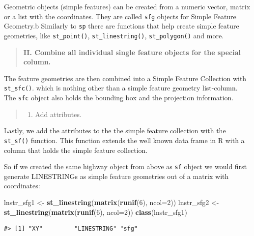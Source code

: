 \documentclass[]{book}
\newenvironment{Shaded}{\begin{snugshade}}{\end{snugshade}}
\newcommand{\KeywordTok}[1]{\textcolor[rgb]{0.13,0.29,0.53}{\textbf{#1}}}
\newcommand{\DataTypeTok}[1]{\textcolor[rgb]{0.13,0.29,0.53}{#1}}
\newcommand{\DecValTok}[1]{\textcolor[rgb]{0.00,0.00,0.81}{#1}}
\newcommand{\StringTok}[1]{\textcolor[rgb]{0.31,0.60,0.02}{#1}}
\newcommand{\NormalTok}[1]{#1}
\providecommand{\tightlist}{%
  \setlength{\itemsep}{0pt}\setlength{\parskip}{0pt}}
\begin{document}
Geometric objects (simple features) can be created from a numeric
vector, matrix or a list with the coordinates. They are called
\texttt{sfg} objects for Simple Feature Geometry.b Similarly to
\texttt{sp} there are functions that help create simple feature
geometries, like \texttt{st\_point()}, \texttt{st\_linestring()},
\texttt{st\_polygon()} and more.

\begin{quote}
\textbf{II. Combine all individual single feature objects for the
special column.}
\end{quote}

The feature geometries are then combined into a Simple Feature
Collection with \texttt{st\_sfc()}. which is nothing other than a simple
feature geometry list-column. The \texttt{sfc} object also holds the
bounding box and the projection information.

\begin{quote}
\begin{enumerate}
\def\labelenumi{\Roman{enumi}.}
\setcounter{enumi}{2}
\tightlist
\item
  Add attributes.
\end{enumerate}
\end{quote}

Lastly, we add the attributes to the the simple feature collection with
the \texttt{st\_sf()} function. This function extends the well known
data frame in R with a column that holds the simple feature collection.

So if we created the same highway object from above as \texttt{sf}
object we would first generate LINESTRINGs as simple feature geometries
out of a matrix with coordinates:

\begin{Shaded}
\begin{Highlighting}[]
\NormalTok{lnstr_sfg1 <-}\StringTok{ }\KeywordTok{st_linestring}\NormalTok{(}\KeywordTok{matrix}\NormalTok{(}\KeywordTok{runif}\NormalTok{(}\DecValTok{6}\NormalTok{), }\DataTypeTok{ncol=}\DecValTok{2}\NormalTok{)) }
\NormalTok{lnstr_sfg2 <-}\StringTok{ }\KeywordTok{st_linestring}\NormalTok{(}\KeywordTok{matrix}\NormalTok{(}\KeywordTok{runif}\NormalTok{(}\DecValTok{6}\NormalTok{), }\DataTypeTok{ncol=}\DecValTok{2}\NormalTok{)) }
\KeywordTok{class}\NormalTok{(lnstr_sfg1)}
\end{Highlighting}
\end{Shaded}

\begin{verbatim}
#> [1] "XY"         "LINESTRING" "sfg"
\end{verbatim}
\end{document}
